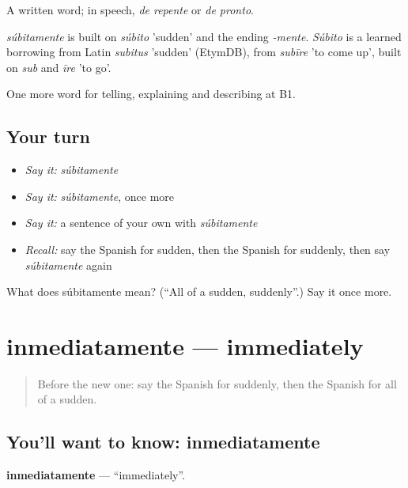 A written word; in speech, \emph{de repente} or \emph{de pronto}.

\begin{cousinweb}
\emph{súbitamente} is built on \emph{súbito} 'sudden' and the ending \emph{-mente}. \emph{Súbito} is a learned borrowing from Latin \emph{subitus} 'sudden' (EtymDB), from \emph{subīre} 'to come up', built on \emph{sub} and \emph{īre} 'to go'.
\end{cousinweb}

\begin{grammarlens}[title={What you've built}]
One more word for telling, explaining and describing at B1.
\end{grammarlens}

\subsection*{Your turn}
\begin{itemize}
\raggedright
  \item \emph{Say it:} \emph{súbitamente}
  \item \emph{Say it:} \emph{súbitamente}, once more
  \item \emph{Say it:} a sentence of your own with \emph{súbitamente}
  \item \emph{Recall:} say the Spanish for sudden, then the Spanish for suddenly, then say \emph{súbitamente} again
\end{itemize}

\begin{tcolorbox}[breakable,colback=teal!4,colframe=teal!35!black,title={Before you move on}]
What does súbitamente mean? (\textquotedblleft{}All of a sudden, suddenly\textquotedblright{}.) Say it once more.
\end{tcolorbox}
\section[inmediatamente]{inmediatamente — immediately}

\label{lesson:ES-C534-inmediatamente}



\begin{quote}
Before the new one: say the Spanish for suddenly, then the Spanish for all of a sudden.
\end{quote}

\subsection*{You'll want to know: inmediatamente}
\textbf{inmediatamente} — \textquotedblleft{}immediately\textquotedblright{}.

